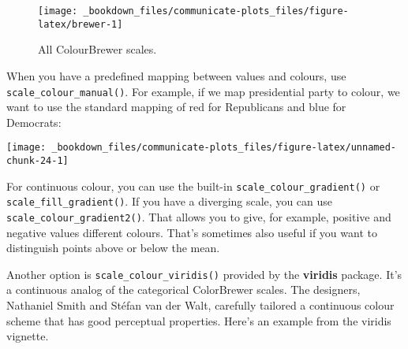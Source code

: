 \documentclass[]{book}
\newenvironment{Shaded}{\begin{snugshade}}{\end{snugshade}}
\newcommand{\KeywordTok}[1]{\textcolor[rgb]{0.13,0.29,0.53}{\textbf{{#1}}}}
\newcommand{\DataTypeTok}[1]{\textcolor[rgb]{0.13,0.29,0.53}{{#1}}}
\newcommand{\DecValTok}[1]{\textcolor[rgb]{0.00,0.00,0.81}{{#1}}}
\newcommand{\StringTok}[1]{\textcolor[rgb]{0.31,0.60,0.02}{{#1}}}
\newcommand{\NormalTok}[1]{{#1}}
\begin{document}
\begin{figure}

{\centering \texttt{[image: \_bookdown\_files/communicate-plots\_files/figure-latex/brewer-1]} 

}

\caption{All ColourBrewer scales.}\label{fig:brewer}
\end{figure}

When you have a predefined mapping between values and colours, use
\texttt{scale\_colour\_manual()}. For example, if we map presidential
party to colour, we want to use the standard mapping of red for
Republicans and blue for Democrats:

\begin{Shaded}
\end{Shaded}

\begin{center}\texttt{[image: \_bookdown\_files/communicate-plots\_files/figure-latex/unnamed-chunk-24-1]} \end{center}

For continuous colour, you can use the built-in
\texttt{scale\_colour\_gradient()} or \texttt{scale\_fill\_gradient()}.
If you have a diverging scale, you can use
\texttt{scale\_colour\_gradient2()}. That allows you to give, for
example, positive and negative values different colours. That's
sometimes also useful if you want to distinguish points above or below
the mean.

Another option is \texttt{scale\_colour\_viridis()} provided by the
\textbf{viridis} package. It's a continuous analog of the categorical
ColorBrewer scales. The designers, Nathaniel Smith and Stéfan van der
Walt, carefully tailored a continuous colour scheme that has good
perceptual properties. Here's an example from the viridis vignette.
\end{document}
